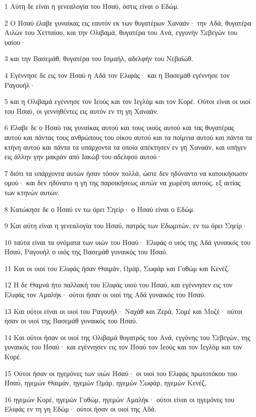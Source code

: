 \par 1 Αύτη δε είναι η γενεαλογία του Ησαύ, όστις είναι ο Εδώμ.
\par 2 Ο Ησαύ έλαβε γυναίκας εις εαυτόν εκ των θυγατέρων Χαναάν· την Αδά, θυγατέρα Αιλών του Χετταίου, και την Ολιβαμά, θυγατέρα του Ανά, εγγονήν Σεβεγών του υαίου·
\par 3 και την Βασεμάθ, θυγατέρα του Ισμαήλ, αδελφήν του Νεβαϊώθ.
\par 4 Εγέννησε δε εις τον Ησαύ η Αδά τον Ελιφάς· και η Βασεμάθ εγέννησε τον Ραγουήλ·
\par 5 και η Ολιβαμά εγέννησε τον Ιεούς και τον Ιεγλόμ και τον Κορέ. Ούτοι είναι οι υιοί του Ησαύ, οι γεννηθέντες εις αυτόν εν τη γη Χαναάν.
\par 6 Έλαβε δε ο Ησαύ τας γυναίκας αυτού και τους υιούς αυτού και τας θυγατέρας αυτού και πάντας τους ανθρώπους του οίκου αυτού και τα ποίμνια αυτού και πάντα τα κτήνη αυτού και πάντα τα υπάρχοντα τα οποία απέκτησεν εν γη Χαναάν, και υπήγεν εις άλλην γην μακράν από Ιακώβ του αδελφού αυτού·
\par 7 διότι τα υπάρχοντα αυτών ήσαν τόσον πολλά, ώστε δεν ηδύναντο να κατοικήσωσιν ομού· και δεν ηδύνατο η γη της παροικήσεως αυτών να χωρέση αυτούς, εξ αιτίας των κτηνών αυτών.
\par 8 Κατώκησε δε ο Ησαύ εν τω όρει Σηείρ· ο Ησαύ είναι ο Εδώμ.
\par 9 Και αύτη είναι η γενεαλογία του Ησαύ, πατρός των Εδωμιτών, εν τω όρει Σηείρ·
\par 10 ταύτα είναι τα ονόματα των υιών του Ησαύ· Ελιφάς ο υιός της Αδά γυναικός του Ησαύ, Ραγουήλ ο υιός της Βασεμάθ γυναικός του Ησαύ.
\par 11 Και οι υιοί του Ελιφάς ήσαν Θαιμάν, Ωμάρ, Σωφάρ και Γοθώμ και Κενέζ.
\par 12 Η δε Θαμνά ήτο παλλακή του Ελιφάς υιού του Ησαύ, και εγέννησεν εις τον Ελιφάς τον Αμαλήκ· ούτοι ήσαν οι υιοί της Αδά γυναικός του Ησαύ.
\par 13 Και ούτοι είναι οι υιοί του Ραγουήλ· Ναχάθ και Ζερά, Σομέ και Μοζέ· ούτοι ήσαν οι υιοί της Βασεμάθ γυναικός του Ησαύ.
\par 14 Και ούτοι ήσαν οι υιοί της Ολιβαμά θυγατρός του Ανά, εγγόνης του Σεβεγών, της γυναικός του Ησαύ· και εγέννησεν εις τον Ησαύ τον Ιεούς και τον Ιεγλόμ και τον Κορέ.
\par 15 Ούτοι ήσαν οι ηγεμόνες των υιών Ησαύ· οι υιοί του Ελιφάς πρωτοτόκου του Ησαύ, ηγεμών Θαιμάν, ηγεμών Ωμάρ, ηγεμών Σωφάρ, ηγεμών Κενέζ,
\par 16 ηγεμών Κορέ, ηγεμών Γοθώμ, ηγεμών Αμαλήκ· ούτοι είναι οι ηγεμόνες του Ελιφάς εν τη γη Εδώμ· ούτοι ήσαν οι υιοί της Αδά.
